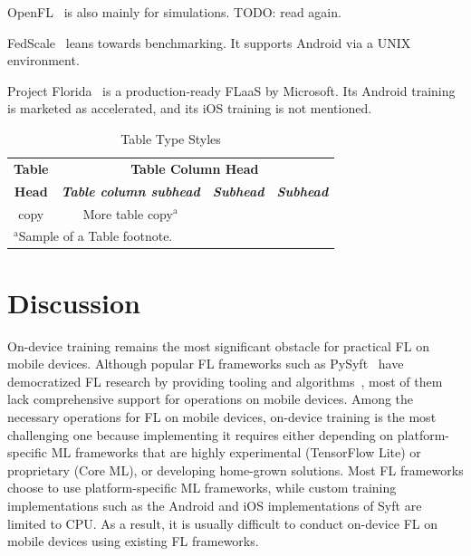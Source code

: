 \documentclass[conference]{IEEEtran}
\begin{document}
OpenFL~\cite{patrick2022openfl} is also mainly for simulations.
TODO: read again.

FedScale~\cite{lai2022fedscale} leans towards benchmarking.
It supports Android via a UNIX environment.

Project Florida~\cite{madrigal2023project}
is a production-ready FLaaS by Microsoft.
Its Android training is marketed as accelerated,
and its iOS training is not mentioned.


\begin{table}[htbp]
\caption{Table Type Styles}
\begin{center}
\begin{tabular}{|c|c|c|c|}
\hline
\textbf{Table}&\multicolumn{3}{|c|}{\textbf{Table Column Head}} \\
\cline{2-4} 
\textbf{Head} & \textbf{\textit{Table column subhead}}& \textbf{\textit{Subhead}}& \textbf{\textit{Subhead}} \\
\hline
copy& More table copy$^{\mathrm{a}}$& &  \\
\hline
\multicolumn{4}{l}{$^{\mathrm{a}}$Sample of a Table footnote.}
\end{tabular}
\label{tab1}
\end{center}
\end{table}

\section{Discussion}


On-device training remains the most significant obstacle for
practical FL on mobile devices.
Although popular FL frameworks such as
PySyft~\cite{ryffel2018generic,Ziller2021,hall2021syft}
have democratized FL research by providing tooling and
algorithms~\cite{sriraman2022device},
most of them lack comprehensive support for operations on mobile devices.
Among the necessary operations for FL on mobile devices,
on-device training is the most challenging one because
implementing it requires either depending on
platform-specific ML frameworks that are highly experimental (TensorFlow Lite)
or proprietary (Core ML),
or developing home-grown solutions.
Most FL frameworks choose to use platform-specific ML frameworks,
while custom training implementations such as
the Android and iOS implementations of Syft are limited to CPU.
As a result, it is usually difficult to conduct on-device FL
on mobile devices using existing FL frameworks.
\end{document}
